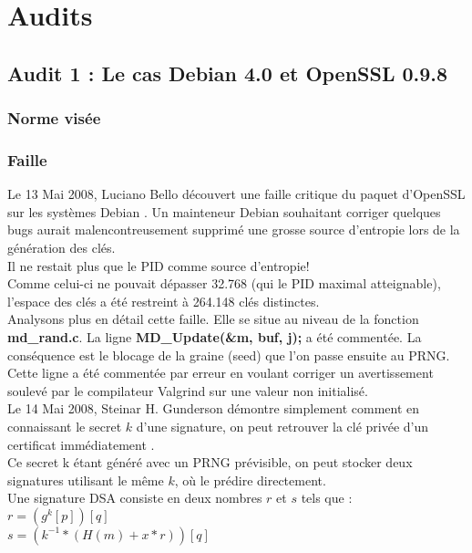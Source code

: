 \section{Audits}
	\subsection{Audit 1 : Le cas Debian 4.0 et OpenSSL 0.9.8}
	\subsubsection{Norme visée}
	\subsubsection{Faille}
		Le 13 Mai 2008, Luciano Bello découvert une faille critique du 
		paquet d'OpenSSL sur les systèmes Debian
		\cite{faille2008linux.org}. Un mainteneur Debian 	
		souhaitant corriger quelques bugs aurait malencontreusement 	
		supprimé une grosse source d'entropie lors de la génération des 
		clés. \\
		Il ne restait plus que le PID comme source d'entropie!\\
		Comme celui-ci ne pouvait dépasser 32.768 (qui le PID maximal
		atteignable), l'espace des clés a été restreint à 264.148 clés
		distinctes.\\
		
		Analysons plus en détail cette faille. Elle se situe au niveau de 
		la fonction \textbf{md\_rand.c}.
		La ligne \textbf{MD\_Update(\&m, buf, j);} a été commentée.
		La conséquence est le blocage de la graine (seed) que l'on 
		passe ensuite au PRNG.\\
	
		Cette ligne a été commentée par erreur en voulant corriger un
		avertissement soulevé par le compilateur Valgrind sur une valeur
		non initialisé.\\
	
		Le 14 Mai 2008, Steinar H. Gunderson démontre simplement comment
		en connaissant le secret $k$ d'une signature, on peut retrouver
		la clé privée d'un certificat immédiatement \cite{gunderson2008}.\\
	
		Ce secret k étant généré avec un PRNG prévisible, on peut stocker
		deux signatures utilisant le même $k$, où le prédire directement.\\
	
		Une signature DSA consiste en deux nombres $r$ et $s$ tels que :\\
		$r = (g^k [p]) [q]$\\
		$s = (k^{-1} * (H(m) + x * r)) [q]$\\
	
